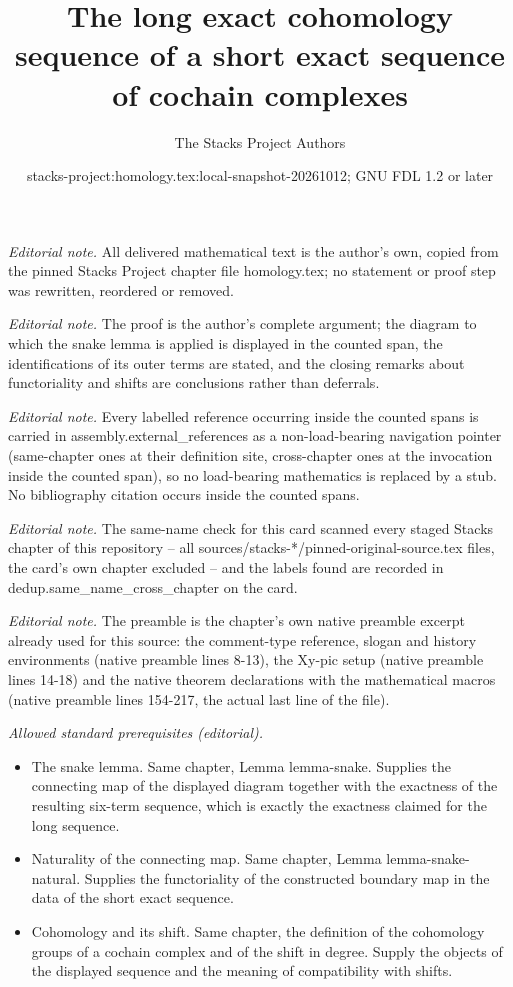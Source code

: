 \documentclass[10pt,a4paper]{amsart}
\title{The long exact cohomology sequence of a short exact sequence of cochain complexes}
\author{The Stacks Project Authors}
\date{stacks-project:homology.tex:local-snapshot-20261012; GNU FDL 1.2 or later}
\theoremstyle{plain}
\theoremstyle{definition}
\theoremstyle{remark}
\numberwithin{equation}{subsection}
\begin{document}
\maketitle
\noindent\textit{Editorial note.} All delivered mathematical text is the author's own, copied from the pinned Stacks Project chapter file homology.tex; no statement or proof step was rewritten, reordered or removed.\par\medskip
\noindent\textit{Editorial note.} The proof is the author's complete argument; the diagram to which the snake lemma is applied is displayed in the counted span, the identifications of its outer terms are stated, and the closing remarks about functoriality and shifts are conclusions rather than deferrals.\par\medskip
\noindent\textit{Editorial note.} Every labelled reference occurring inside the counted spans is carried in assembly.external\_references as a non-load-bearing navigation pointer (same-chapter ones at their definition site, cross-chapter ones at the invocation inside the counted span), so no load-bearing mathematics is replaced by a stub. No bibliography citation occurs inside the counted spans.\par\medskip
\noindent\textit{Editorial note.} The same-name check for this card scanned every staged Stacks chapter of this repository -- all sources/stacks-*/pinned-original-source.tex files, the card's own chapter excluded -- and the labels found are recorded in dedup.same\_name\_cross\_chapter on the card.\par\medskip
\noindent\textit{Editorial note.} The preamble is the chapter's own native preamble excerpt already used for this source: the comment-type reference, slogan and history environments (native preamble lines 8-13), the Xy-pic setup (native preamble lines 14-18) and the native theorem declarations with the mathematical macros (native preamble lines 154-217, the actual last line of the file).\par\medskip
\noindent\textit{Allowed standard prerequisites (editorial).}\begin{itemize}
\item The snake lemma. Same chapter, Lemma lemma-snake. Supplies the connecting map of the displayed diagram together with the exactness of the resulting six-term sequence, which is exactly the exactness claimed for the long sequence.
\item Naturality of the connecting map. Same chapter, Lemma lemma-snake-natural. Supplies the functoriality of the constructed boundary map in the data of the short exact sequence.
\item Cohomology and its shift. Same chapter, the definition of the cohomology groups of a cochain complex and of the shift in degree. Supply the objects of the displayed sequence and the meaning of compatibility with shifts.
\end{itemize}\medskip
\end{document}
